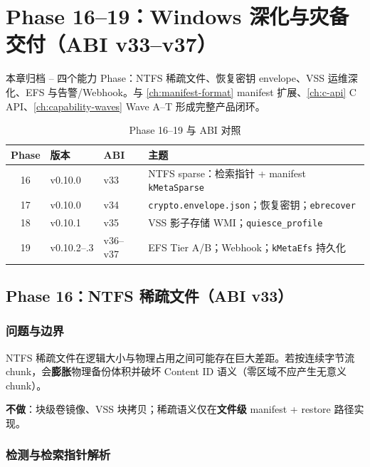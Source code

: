 \chapter{Phase 16--19：Windows 深化与灾备交付（ABI v33--v37）}
\label{ch:phase16-19}

本章归档 -- 四个能力 Phase：NTFS 稀疏文件、恢复密钥 envelope、VSS 运维深化、EFS 与告警/Webhook。与 \cref{ch:manifest-format} manifest 扩展、\cref{ch:c-api} C API、\cref{ch:capability-waves} Wave A--T 形成完整产品闭环。

\begin{table}[htbp]
\centering
\caption{Phase 16--19 与 ABI 对照}
\small
\begin{tabular}{@{}clll@{}}
\toprule
Phase & 版本 & ABI & 主题 \\
\midrule
16 & v0.10.0 & v33 & NTFS sparse：检索指针 + manifest \texttt{kMetaSparse} \\
17 & v0.10.0 & v34 & \texttt{crypto.envelope.json}；恢复密钥；\texttt{ebrecover} \\
18 & v0.10.1 & v35 & VSS 影子存储 WMI；\texttt{quiesce\_profile} \\
19 & v0.10.2--.3 & v36--v37 & EFS Tier A/B；Webhook；\texttt{kMetaEfs} 持久化 \\
\bottomrule
\end{tabular}
\end{table}

\section{Phase 16：NTFS 稀疏文件（ABI v33）}
\label{sec:phase16-sparse}

\subsection{问题与边界}

NTFS 稀疏文件在逻辑大小与物理占用之间可能存在巨大差距。若按连续字节流 chunk，会\textbf{膨胀}物理备份体积并破坏 Content ID 语义（零区域不应产生无意义 chunk）。

\textbf{不做}：块级卷镜像、VSS 块拷贝；稀疏语义仅在\textbf{文件级} manifest + restore 路径实现。

\subsection{检测与检索指针解析}

